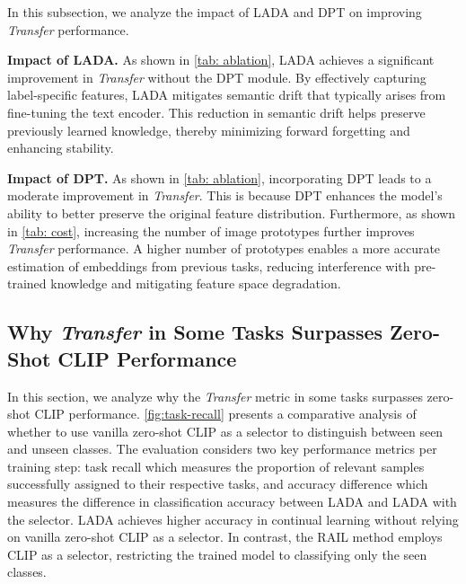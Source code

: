 \documentclass{article}
\theoremstyle{plain}
\theoremstyle{definition}
\theoremstyle{remark}
\def\algo{LADA\xspace}
\begin{document}
In this subsection, we analyze the impact of \algo and DPT on improving \emph{Transfer} performance.

\textbf{Impact of \algo.} As shown in \cref{tab: ablation}, \algo achieves a significant improvement in \emph{Transfer} without the DPT module. By effectively capturing label-specific features, LADA mitigates semantic drift that typically arises from fine-tuning the text encoder. This reduction in semantic drift helps preserve previously learned knowledge, thereby minimizing forward forgetting and enhancing stability.


\textbf{Impact of DPT.} As shown in \cref{tab: ablation}, incorporating DPT leads to a moderate improvement in \emph{Transfer}. This is because DPT enhances the model's ability to better preserve the original feature distribution. Furthermore, as shown in \cref{tab: cost}, increasing the number of image prototypes further improves \emph{Transfer} performance. A higher number of prototypes enables a more accurate estimation of embeddings from previous tasks, reducing interference with pre-trained knowledge and mitigating feature space degradation.


\subsection{Why \emph{Transfer} in Some Tasks Surpasses Zero-Shot CLIP Performance}
\label{why surpass zeroshot}

In this section, we analyze why the \emph{Transfer} metric in some tasks surpasses zero-shot CLIP performance. \cref{fig:task-recall} presents a comparative analysis of whether to use vanilla zero-shot CLIP as a selector to distinguish between seen and unseen classes. The evaluation considers two key performance metrics per training step: task recall which measures the proportion of relevant samples successfully assigned to their respective tasks, and accuracy difference which measures the difference in classification accuracy between LADA and LADA with the selector. LADA achieves higher accuracy in continual learning without relying on vanilla zero-shot CLIP as a selector. In contrast, the RAIL method \cite{xu2024advancing} employs CLIP as a selector, restricting the trained model to classifying only the seen classes.
\end{document}
